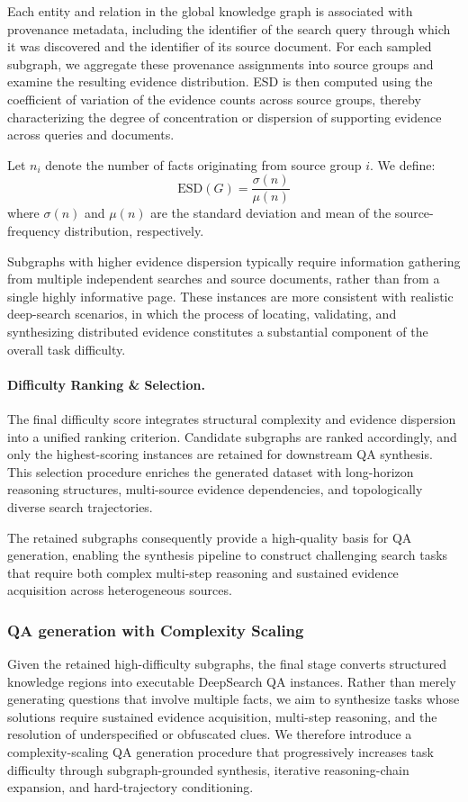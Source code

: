 \documentclass{huawei}
\begin{document}
Each entity and relation in the global knowledge graph is associated with provenance metadata, including the identifier of the search query through which it was discovered and the identifier of its source document. For each sampled subgraph, we aggregate these provenance assignments into source groups and examine the resulting evidence distribution. ESD is then computed using the coefficient of variation of the evidence counts across source groups, thereby characterizing the degree of concentration or dispersion of supporting evidence across queries and documents.


Let $n_i$ denote the number of facts originating from source group $i$. We define:
\begin{equation}
\text{ESD}(G)=\frac{\sigma(n)}{\mu(n)}
\end{equation}
where $\sigma(n)$ and $\mu(n)$ are the standard deviation and mean of the source-frequency distribution, respectively.


Subgraphs with higher evidence dispersion typically require information gathering from multiple independent searches and source documents, rather than from a single highly informative page. These instances are more consistent with realistic deep-search scenarios, in which the process of locating, validating, and synthesizing distributed evidence constitutes a substantial component of the overall task difficulty.


\paragraph{Difficulty Ranking \& Selection.}
The final difficulty score integrates structural complexity and evidence dispersion into a unified ranking criterion. Candidate subgraphs are ranked accordingly, and only the highest-scoring instances are retained for downstream QA synthesis. This selection procedure enriches the generated dataset with long-horizon reasoning structures, multi-source evidence dependencies, and topologically diverse search trajectories.


The retained subgraphs consequently provide a high-quality basis for QA generation, enabling the synthesis pipeline to construct challenging search tasks that require both complex multi-step reasoning and sustained evidence acquisition across heterogeneous sources.



\subsubsection{QA generation with Complexity Scaling}
Given the retained high-difficulty subgraphs, the final stage converts structured knowledge regions into executable DeepSearch QA instances. Rather than merely generating questions that involve multiple facts, we aim to synthesize tasks whose solutions require sustained evidence acquisition, multi-step reasoning, and the resolution of underspecified or obfuscated clues. We therefore introduce a complexity-scaling QA generation procedure that progressively increases task difficulty through subgraph-grounded synthesis, iterative reasoning-chain expansion, and hard-trajectory conditioning.
\end{document}
